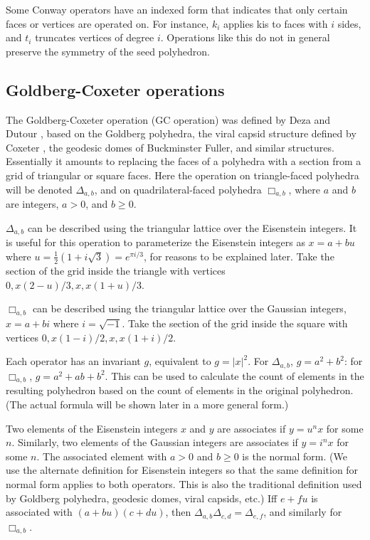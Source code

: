 \documentclass{article}
\begin{document}
Some Conway operators have an indexed form that indicates that only certain faces or
vertices are operated on. For instance, $k_i$ applies kis to faces with
$i$ sides, and $t_i$ truncates vertices of degree $i$.
Operations like this do not in general preserve the symmetry of the seed
polyhedron.

\subsection{Goldberg-Coxeter operations}
The Goldberg-Coxeter operation (GC operation) was defined by Deza and
Dutour \cite{Deza2004}, based on the Goldberg polyhedra, the viral capsid
structure defined by Coxeter \cite{Coxeter}, the geodesic domes of Buckminster
Fuller, and similar structures. Essentially it amounts to replacing the faces of
a polyhedra with a section from a grid of triangular or square faces. Here the
operation on triangle-faced polyhedra will be denoted $\Delta_{a,b}$, and on
quadrilateral-faced polyhedra $\Box_{a,b}$, where $a$ and $b$ are integers,
$a > 0$, and $b \ge 0$.

$\Delta_{a,b}$ can be described using the triangular lattice over the
Eisenstein integers. It is useful for this operation to parameterize the
Eisenstein integers as $x = a + bu$ where $u = \frac{1}{2}(1 + i\sqrt 3) =
e^{\pi i/3}$, for reasons to be explained later. Take the section of the grid
inside the triangle with vertices $0, x(2-u)/3, x, x(1+u)/3$.

$\Box_{a,b}$ can be described using the triangular lattice over the Gaussian
integers, $x = a + bi$ where $i = \sqrt{-1}$. Take the section of the grid
inside the square with vertices $0, x(1-i)/2, x, x(1+i)/2$.

Each operator has an invariant $g$, equivalent to $g = |x|^2$. For
$\Delta_{a,b}$, $g = a^2 + b^2$: for $\Box_{a,b}$, $g = a^2 + ab + b^2$. This
can be used to calculate the count of elements in the resulting polyhedron
based on the count of elements in the original polyhedron. (The actual formula
will be shown later in a more general form.)

Two elements of the Eisenstein integers $x$ and $y$ are associates if
$y = u^n x$ for some $n$. Similarly, two elements of the Gaussian integers are
associates if $y = i^n x$ for some $n$. The associated element with $a>0$ and
$b\ge 0$ is the normal form. (We use the alternate definition for Eisenstein
integers so that the same definition for normal form applies to both operators.
This is also the traditional definition used by Goldberg polyhedra, geodesic
domes, viral capsids, etc.) Iff $e+fu$ is associated with $(a+bu)(c+du)$, then
$\Delta_{a,b}\Delta_{c,d} = \Delta_{e,f}$, and similarly for $\Box_{a,b}$.
\end{document}
